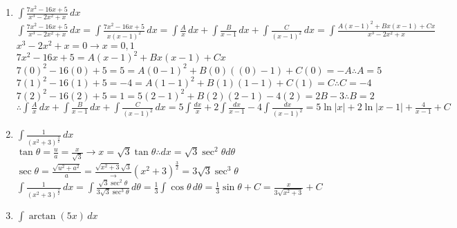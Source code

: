 \documentclass[10pt, letterpaper]{report}
\begin{document}
\begin{enumerate}
  \item{$\int{\frac{7x^{2}-16x+5}{x^{3}-2x^{2}+x}}\,dx$} \\
  
    $\int{\frac{7x^{2}-16x+5}{x^{3}-2x^{2}+x}}\,dx=
    \int{\frac{7x^{2}-16x+5}{x(x-1)^{2}}}\,dx=
    \int{\frac{A}{x}}\,dx+\int{\frac{B}{x-1}}\,dx+\int{\frac{C}{\left(x-1\right)^{2}}}\,dx=
    \int{\frac{A\left(x-1\right)^{2}+Bx(x-1)+Cx}{x^{3}-2x^{2}+x}}$ \\
    
    $x^{3}-2x^{2}+x=0\rightarrow x=0, 1$ \\
    
    $7x^{2}-16x+5=A\left(x-1\right)^{2}+Bx(x-1)+Cx$ \\
    
    $7(0)^{2}-16(0)+5=5=A\left(0-1\right)^{2}+B(0)((0)-1)+C(0)=-A\therefore A=5$ \\
    
    $7(1)^{2}-16(1)+5=-4=A\left(1-1\right)^{2}+B(1)(1-1)+C(1)=C\therefore C=-4$ \\
    
    $7(2)^{2}-16(2)+5=1=5\left(2-1\right)^{2}+B(2)(2-1)-4(2)=2B-3\therefore B=2 $ \\
    
    $\therefore \int{\frac{A}{x}}\,dx+\int{\frac{B}{x-1}}\,dx+\int{\frac{C}{\left(x-1\right)^{2}}}\,dx=
    5\int{\frac{dx}{x}}+2\int{\frac{dx}{x-1}}-4\int{\frac{dx}{\left(x-1\right)^{2}}}=
    5\ln{\left|x\right|}+2\ln{\left|x-1\right|}+\frac{4}{x-1}+C$
    
  \item{$\int{\frac{1}{\left(x^{2}+3\right)^{\frac{3}{2}}}}\,dx$} \\  
  
    $\tan{\theta}=\frac{u}{a}=\frac{x}{\sqrt{3}}\rightarrow x=\sqrt{3}\tan{\theta}\therefore dx=\sqrt{3}\sec^{2}{\theta}d\theta$ \\
    
    $\sec{\theta}=\frac{\sqrt{u^{2}+a^{2}}}{a}=\frac{\sqrt{x^{2}+3}{\sqrt{3}}}\rightarrow (x^{2}+3)^{\frac{3}{2}}=3\sqrt{3}\sec^{3}{\theta}$ \\
    
    $\int{\frac{1}{\left(x^{2}+3\right)^{\frac{3}{2}}}}\,dx=
    \int{\frac{\sqrt{3}\sec^{2}{\theta}}{3\sqrt{3}\sec^{3}{\theta}}}\,d\theta=
    \frac{1}{3}\int{\cos{\theta}}\,d\theta=
    \frac{1}{3}\sin{\theta}+C=
    \frac{x}{3\sqrt{x^{2}+3}}+C$ \\
    
  \item{$\int{\arctan{(5x)}}\,dx$} \\
  

\end{enumerate}
\end{document}
